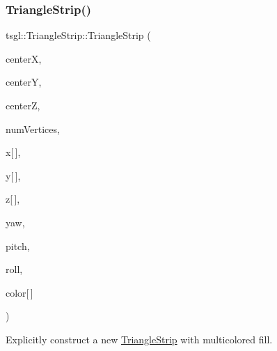 \subsubsection{\texorpdfstring{Triangle\+Strip()}{TriangleStrip()}\hspace{0.1cm}{\footnotesize\ttfamily [2/2]}}
{\footnotesize\ttfamily tsgl\+::\+Triangle\+Strip\+::\+Triangle\+Strip (\begin{DoxyParamCaption}\item[{float}]{centerX,  }\item[{float}]{centerY,  }\item[{float}]{centerZ,  }\item[{int}]{num\+Vertices,  }\item[{float}]{x\mbox{[}$\,$\mbox{]},  }\item[{float}]{y\mbox{[}$\,$\mbox{]},  }\item[{float}]{z\mbox{[}$\,$\mbox{]},  }\item[{float}]{yaw,  }\item[{float}]{pitch,  }\item[{float}]{roll,  }\item[{\hyperlink{structtsgl_1_1_color_float}{Color\+Float}}]{color\mbox{[}$\,$\mbox{]} }\end{DoxyParamCaption})}



Explicitly construct a new \hyperlink{classtsgl_1_1_triangle_strip}{Triangle\+Strip} with multicolored fill. 

